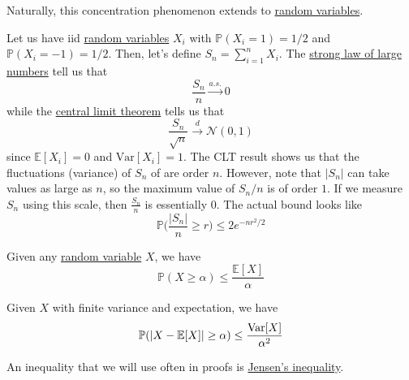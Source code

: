 Naturally, this concentration phenomenon extends to \hyperref[prob-def:random-variable]{random variables}. 

\begin{example}
  \label{ex:concentration-of-a-symmetric-random-walk}
Let us have iid \hyperref[prob-def:random-variable]{random variables} $X_i$ with $\mathbb{P}(X_i = 1) = 1/2$ and $\mathbb{P}(X_i = -1) = 1/2$. Then, let's define $S_n = \sum_{i=1}^n X_i$. The \hyperref[prob-thm:strong-law-of-large-numbers]{strong law of large numbers} tell us that 
\begin{equation}
  \frac{S_n}{n} \xrightarrow{a.s.} 0
\end{equation}
while the \hyperref[prob-thm:central-limit-theorem]{central limit theorem} tells us that 
\begin{equation}
  \frac{S_n}{\sqrt{n}} \xrightarrow{d} \mathcal{N}(0, 1)
\end{equation}
since $\mathbb{E}[X_i] = 0$ and $\mathrm{Var}[X_i] = 1$. The CLT result shows us that the fluctuations (variance) of $S_n$ of are order $n$. However, note that $|S_n|$ can take values as large as $n$, so the maximum value of $S_n / n$ is of order $1$. If we measure $S_n$ using this scale, then $\frac{S_n}{n}$ is essentially $0$. The actual bound looks like 
\begin{equation}
  \mathbb{P} \bigg( \frac{|S_n|}{n} \geq r \bigg) \leq 2 e^{-n r^2 / 2}
\end{equation}
\end{example}

\begin{lemma}
  \label{thm:markovs-inequality}
Given any \hyperref[prob-def:random-variable]{random variable} $X$, we have 
\begin{equation}
  \mathbb{P}(X \geq \alpha) \leq \frac{\mathbb{E}[X]}{\alpha}
\end{equation}
\end{lemma}

\begin{lemma}
  \label{thm:chebyshevs-inequality}
Given $X$ with finite variance and expectation, we have 
\begin{equation}
  \mathbb{P}(|X - \mathbb{E}[X]| \geq \alpha) \leq \frac{\operatorname{Var}[X]}{\alpha^2}
\end{equation}
\end{lemma}

An inequality that we will use often in proofs is \hyperref[prob-thm:jensens-inequality]{Jensen's inequality}. 

